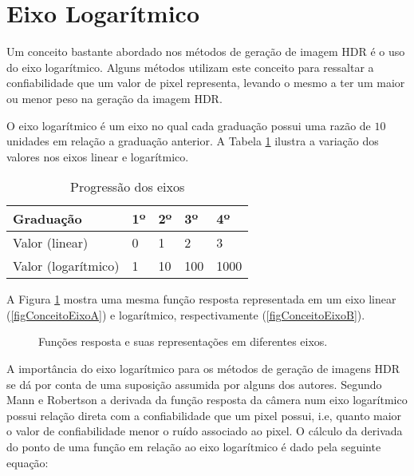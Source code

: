 \section{Eixo Logarítmico} \label{conceitoGaussiana}

	Um conceito bastante abordado nos métodos de geração de imagem HDR é o uso do eixo logarítmico. Alguns métodos utilizam este conceito para ressaltar a confiabilidade que um valor de pixel representa, levando o mesmo a ter um maior ou menor peso na geração da imagem HDR.
	
	O eixo logarítmico é um eixo no qual cada graduação possui uma razão de $10$ unidades em relação a graduação anterior. A Tabela \ref{tabConceitosEixo} ilustra a variação dos valores nos eixos linear e logarítmico.
	
\begin{table}[H]
  \centering
  \caption{Progressão dos eixos}
  \label{tabConceitosEixo}
  \begin{tabular}{l|l|l|l|l}
    \hline
    Graduação           & 1º & 2º & 3º  & 4º   \\
    \hline
    Valor (linear)      & 0  & 1  & 2   & 3    \\
    \hline
    Valor (logarítmico) & 1  & 10 & 100 & 1000 \\  
    \hline
  \end{tabular}
\end{table}
	
	A Figura \ref{figConceitoEixo} mostra uma mesma função resposta representada em um eixo linear (\ref{figConceitoEixoA}) e logarítmico, respectivamente (\ref{figConceitoEixoB}).
	
\begin{figure}[H]
  \centering
  \quad %
  \caption{Funções resposta e suas representações em diferentes eixos.}
  \label{figConceitoEixo}
\end{figure}

	A importância do eixo logarítmico para os métodos de geração de imagens HDR se dá por conta de uma suposição assumida por alguns dos autores. Segundo Mann \cite{mann} e Robertson \cite{robertson} a derivada da função resposta da câmera num eixo logarítmico possui relação direta com a confiabilidade que um pixel possui, i.e, quanto maior o valor de confiabilidade menor o ruído associado ao pixel. O cálculo da derivada do ponto de uma função em relação ao eixo logarítmico é dado pela seguinte equação:
	
